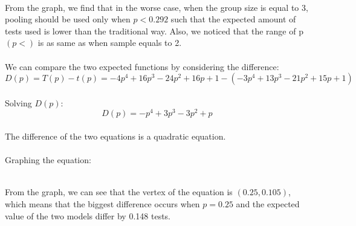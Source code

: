 \\
From the graph, we find that in the worse case, when the group size is equal to 3, pooling should be used only when $p<0.292$ such that the expected amount of tests used is lower than the traditional way. Also, we noticed that the range of  p $(p<)$ is as same as when sample equals to 2.
\\
\\
We can compare the two expected functions by considering the difference:
\\
\begin{displaymath}
D(p)=T(p)-t(p)=-4p^4+16p^3-24p^2+16p+1-(-3p^{4}+13p^{3}-21p^{2}+15p+1)
\end{displaymath}
\\
Solving $D(p):$
\\
\begin{displaymath}
D(p)=-p^4+3p^3-3p^2+p
\end{displaymath}
\\
The difference of the two equations is a quadratic equation.
\\
\\
Graphing the equation:
\\
\begin{center}
\end{center}
\\
From the graph, we can see that the vertex of the equation is $(0.25,0.105)$, which means that the biggest difference occurs when $p=0.25$ and the expected value of the two models differ by 0.148 tests.